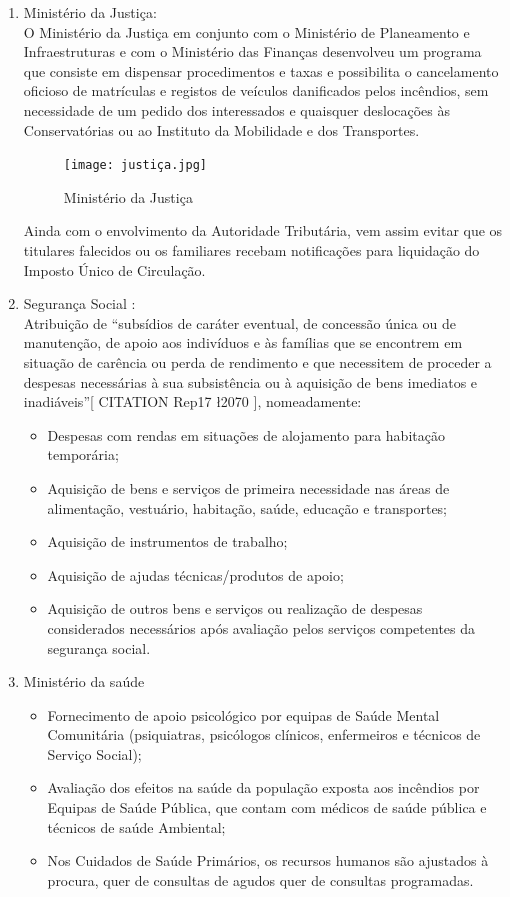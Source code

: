 \documentclass{report}
\begin{document}
\begin{enumerate}
 \item Ministério da Justiça:\\
 O Ministério da Justiça em conjunto com o Ministério de Planeamento e Infraestruturas e com o Ministério das Finanças desenvolveu um programa que consiste em dispensar procedimentos e taxas e possibilita o cancelamento oficioso de matrículas e registos de veículos danificados pelos incêndios, sem necessidade de um pedido dos interessados e quaisquer deslocações às Conservatórias ou ao Instituto da Mobilidade e dos Transportes.
 
\begin{figure}[H]
\center
\texttt{[image: justiça.jpg]}
\caption{Ministério da Justiça}
\label{agua}
\end{figure} 
 
  Ainda com o envolvimento da Autoridade Tributária, vem assim evitar que os titulares falecidos ou os familiares recebam notificações para liquidação do Imposto Único de Circulação.
 
 \item Segurança Social :\\
 Atribuição de “subsídios de caráter eventual, de concessão única ou de manutenção, de apoio aos indivíduos e às famílias que se encontrem em situação de carência ou perda de rendimento e que necessitem de proceder a despesas necessárias à sua subsistência ou à aquisição de bens imediatos e inadiáveis”[ CITATION Rep17 \l 2070 ], nomeadamente:
 \begin{itemize}
 
  \item Despesas com rendas em situações de alojamento para habitação temporária; 
  \item Aquisição de bens e serviços de primeira necessidade nas áreas de alimentação, vestuário, habitação, saúde, educação e transportes; 
  \item Aquisição de instrumentos de trabalho; 
  \item Aquisição de ajudas técnicas/produtos de apoio; 
  \item Aquisição de outros bens e serviços ou realização de despesas considerados necessários após avaliação pelos serviços competentes da segurança social.
  
 \end{itemize}
 
 \item Ministério da saúde
 \begin{itemize}
  \item Fornecimento de apoio psicológico por equipas de Saúde Mental Comunitária (psiquiatras, psicólogos clínicos, enfermeiros e técnicos de Serviço Social); 
  \item Avaliação dos efeitos na saúde da população exposta aos incêndios por Equipas de Saúde Pública, que contam com médicos de saúde pública e técnicos de saúde Ambiental;
  \item Nos Cuidados de Saúde Primários, os recursos humanos são ajustados à procura, quer de consultas de agudos quer de consultas programadas.
  

\end{itemize}
\end{enumerate}
\end{document}
